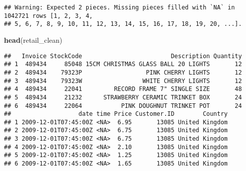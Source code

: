 \documentclass[
]{article}
\newenvironment{Shaded}{\begin{snugshade}}{\end{snugshade}}
\newcommand{\AttributeTok}[1]{\textcolor[rgb]{0.13,0.29,0.53}{#1}}
\newcommand{\DocumentationTok}[1]{\textcolor[rgb]{0.56,0.35,0.01}{\textbf{\textit{#1}}}}
\newcommand{\FunctionTok}[1]{\textcolor[rgb]{0.13,0.29,0.53}{\textbf{#1}}}
\newcommand{\NormalTok}[1]{#1}
\newcommand{\OtherTok}[1]{\textcolor[rgb]{0.56,0.35,0.01}{#1}}
\newcommand{\SpecialCharTok}[1]{\textcolor[rgb]{0.81,0.36,0.00}{\textbf{#1}}}
\begin{document}
\begin{verbatim}
## Warning: Expected 2 pieces. Missing pieces filled with `NA` in 1042721 rows [1, 2, 3, 4,
## 5, 6, 7, 8, 9, 10, 11, 12, 13, 14, 15, 16, 17, 18, 19, 20, ...].
\end{verbatim}

\begin{Shaded}
\begin{Highlighting}[]
\FunctionTok{head}\NormalTok{(retail\_clean)}
\end{Highlighting}
\end{Shaded}

\begin{verbatim}
##   Invoice StockCode                         Description Quantity
## 1  489434     85048 15CM CHRISTMAS GLASS BALL 20 LIGHTS       12
## 2  489434    79323P                  PINK CHERRY LIGHTS       12
## 3  489434    79323W                 WHITE CHERRY LIGHTS       12
## 4  489434     22041         RECORD FRAME 7" SINGLE SIZE       48
## 5  489434     21232      STRAWBERRY CERAMIC TRINKET BOX       24
## 6  489434     22064           PINK DOUGHNUT TRINKET POT       24
##                   date time Price Customer.ID        Country
## 1 2009-12-01T07:45:00Z <NA>  6.95       13085 United Kingdom
## 2 2009-12-01T07:45:00Z <NA>  6.75       13085 United Kingdom
## 3 2009-12-01T07:45:00Z <NA>  6.75       13085 United Kingdom
## 4 2009-12-01T07:45:00Z <NA>  2.10       13085 United Kingdom
## 5 2009-12-01T07:45:00Z <NA>  1.25       13085 United Kingdom
## 6 2009-12-01T07:45:00Z <NA>  1.65       13085 United Kingdom
\end{verbatim}

\begin{Shaded}
\end{Shaded}
\end{document}
